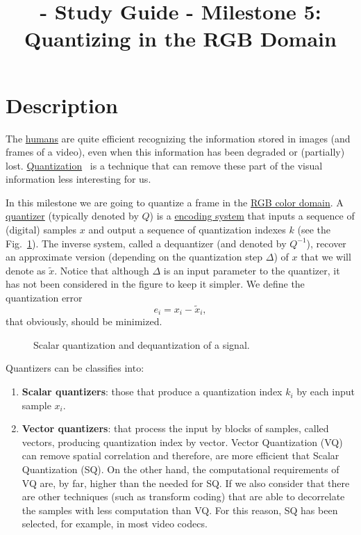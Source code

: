 
\title{\SM{} - Study Guide - Milestone 5: Quantizing in the RGB Domain}

\maketitle

\section{Description}
The \href{https://en.wikipedia.org/wiki/Visual_system}{humans} are
quite efficient recognizing the information stored in images (and
frames of a video), even when this information has been degraded or
(partially)
lost. \href{https://en.wikipedia.org/wiki/Quantization_(signal_processing)}{Quantization}~\cite{sayood2017introduction,vetterli2014foundations}
is a technique that can remove these part of the visual information
less interesting for us.

In this milestone we are going to quantize a frame in
the \href{https://en.wikipedia.org/wiki/RGB_color_model}{RGB color
domain}. A \href{https://en.wikipedia.org/wiki/Quantization_(signal_processing)}{quantizer}
(typically denoted by $Q$) is
a \href{https://en.wikipedia.org/wiki/Data_compression}{encoding
system} that inputs a sequence of (digital) samples $x$ and output a
sequence of quantization indexes $k$ (see the Fig.~\ref{fig:Q}). The
inverse system, called a dequantizer (and denoted by $Q^{-1}$),
recover an approximate version (depending on the quantization step
$\Delta$) of $x$ that we will denote as $\tilde{x}$. Notice that
although $\Delta$ is an input parameter to the quantizer, it has not
been considered in the figure to keep it simpler. We define the
quantization error
\begin{equation}
  e_i = x_i - \tilde{x}_i,
\end{equation}
that obviously, should be minimized.

\begin{figure}
  \centering
  \caption{Scalar quantization and dequantization of a signal.}
  \label{fig:Q}
\end{figure}

Quantizers can be classifies into:
\begin{enumerate}
\item \textbf{Scalar quantizers}: those that produce a quantization
  index $k_i$ by each input sample $x_i$.
\item \textbf{Vector quantizers}: that process the input by
  blocks of samples, called vectors, producing quantization index by
  vector. Vector Quantization (VQ) can remove spatial correlation and
  therefore, are more efficient that Scalar Quantization (SQ). On the
  other hand, the computational requirements of VQ are, by far, higher
  than the needed for SQ. If we also consider that there are other
  techniques (such as transform coding) that are able to decorrelate
  the samples with less computation than VQ. For this reason, SQ has
  been selected, for example, in most video codecs.
\end{enumerate}

